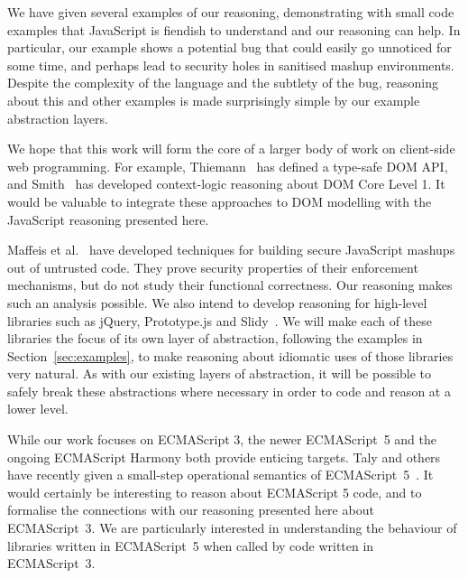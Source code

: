 \documentclass{article}
\begin{document}
We have given several examples of our reasoning, demonstrating with
small code examples that JavaScript is fiendish to understand and our reasoning can help. 
%
In particular, our  example  shows a potential bug that could easily go
unnoticed for some time, and perhaps lead to security holes in sanitised mashup
environments. Despite the complexity of the language and
the subtlety of the bug, reasoning about this and other examples is made
surprisingly simple by our example abstraction layers.


We hope that this work will form the core of a larger body of work on client-side web programming.  
%
For example, Thiemann~\cite{Thiemann05A} has defined a type-safe DOM API, and Smith~\cite{gdsThesis} has  developed   context-logic  reasoning about DOM Core Level 1. It would be valuable to integrate these approaches to DOM modelling with the  JavaScript reasoning presented here. 

Maffeis et al.~\cite{csf,esorics,oakland} have developed techniques for building secure JavaScript mashups out of untrusted code. They prove security properties of their enforcement mechanisms, but do not study their functional correctness. Our reasoning  makes such an  analysis possible.
%
We also intend to develop reasoning for high-level libraries such as
jQuery, Prototype.js and Slidy~\cite{jquery,prototype,slidy}. We will make each of these libraries
the focus of its own layer of abstraction, following the examples in
Section~\ref{sec:examples}, to make reasoning about
idiomatic uses of those libraries very natural. As with our existing
layers of abstraction, it will be possible to safely break these
abstractions where necessary in order to code and reason at a lower
level. 

While our work focuses on ECMAScript 3, the newer 
ECMAScript~5  and the ongoing ECMAScript Harmony both provide enticing
targets. Taly and others have recently given a small-step operational semantics of 
ECMAScript~5~\cite{jsapis}. It 
would certainly be interesting to  reason about ECMAScript 5 code, 
and to formalise the connections with our  reasoning presented here about ECMAScript~3.  We
are particularly interested in understanding the behaviour  of
libraries written in  ECMAScript~5 when called by code
written in  ECMAScript~3. 
\end{document}
